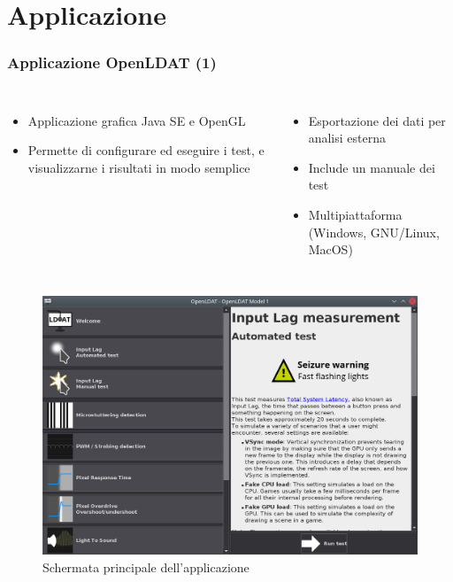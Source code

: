 \documentclass[xcolor={dvipsnames}]{beamer}
\begin{document}
\section{Applicazione}
\begin{frame}[shrink=15]
	\frametitle{Applicazione OpenLDAT (1)}
	\begin{columns}
		\begin{itemize}
			\item \alert{Applicazione grafica} Java SE e OpenGL
			\item Permette di \alert{configurare ed eseguire i test, e visualizzarne i risultati} in modo semplice
		\end{itemize}
		\begin{itemize}
			\item \alert{Esportazione dei dati} per analisi esterna
			\item \alert{Include un manuale} dei test
			\item \alert{Multipiattaforma} (Windows, GNU/Linux, MacOS)
		\end{itemize}
	\end{columns}
	\begin{figure}
		\includegraphics[height=0.7\textheight]{Applicazione_files/gui_mainMenu2.png}
		\caption*{Schermata principale dell'applicazione}
	\end{figure}
\end{frame}
\end{document}
